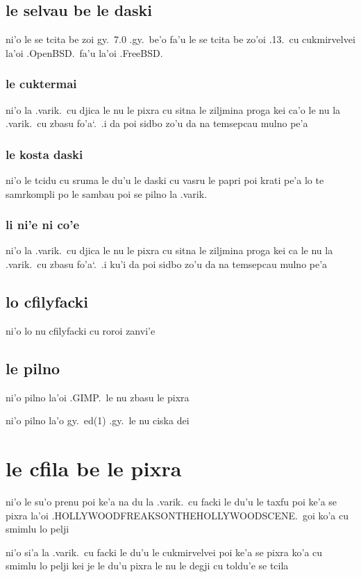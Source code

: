 \documentclass{report}
\newcommand\sds{\spacefactor\sfcode`.\ \space}
\begin{document}
\subsection{le selvau be le daski}
ni'o le se tcita be zoi gy.\ 7.0 .gy.\ be'o fa'u le se tcita be zo'oi .13.\ cu cukmirvelvei la'oi .OpenBSD.\ fa'u la'oi .FreeBSD.

\subsubsection{le cuktermai}
ni'o la .varik.\ cu djica le nu le pixra cu sitna le ziljmina proga kei ca'o le nu la .varik.\ cu zbasu fo'a\sds  .i da poi sidbo zo'u da na temsepcau mulno pe'a

\subsubsection{le kosta daski}
ni'o le tcidu cu sruma le du'u le daski cu vasru le papri poi krati pe'a lo te samrkompli po le sambau poi se pilno la .varik.

\subsubsection{li ni'e ni co'e}
ni'o la .varik.\ cu djica le nu le pixra cu sitna le ziljmina proga kei ca le nu la .varik.\ cu zbasu fo'a\sds  .i ku'i da poi sidbo zo'u da na temsepcau mulno pe'a

\subsection{lo cfilyfacki}
ni'o lo nu cfilyfacki cu roroi zanvi'e

\subsection{le pilno}
ni'o pilno la'oi .GIMP.\ le nu zbasu le pixra

ni'o pilno la'o gy.\ ed(1) .gy.\ le nu ciska dei

\section{le cfila be le pixra}
ni'o le su'o prenu poi ke'a na du la .varik.\ cu facki le du'u le taxfu poi ke'a se pixra la'oi .HOLLYWOODFREAKSONTHEHOLLYWOODSCENE.\ goi ko'a cu smimlu lo pelji

ni'o si'a la .varik.\ cu facki le du'u le cukmirvelvei poi ke'a se pixra ko'a cu smimlu lo pelji kei je le du'u pixra le nu le degji cu toldu'e se tcila
\end{document}
